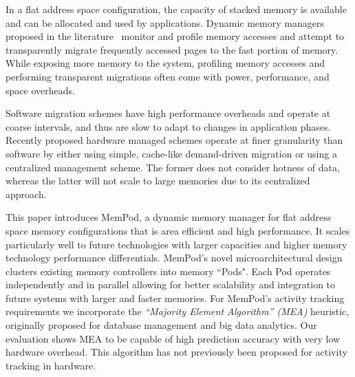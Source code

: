 In a flat address space configuration, the capacity of stacked memory is 
available and can be allocated and used by applications. Dynamic memory 
managers proposed in the literature~\cite{sim-micro2014,meswani-HPCA21,CAMEO} 
monitor and profile memory accesses and attempt to transparently migrate 
frequently accessed pages to the fast portion of memory. While exposing
more memory to the system, profiling memory accesses and performing 
transparent migrations often come with power, performance, and space overheads. 



Software migration schemes \cite{meswani-HPCA21} have high performance 
overheads and operate at coarse intervals, and thus are slow to adapt to 
changes in application phases. Recently proposed hardware managed schemes \cite{sim-micro2014,CAMEO} operate at finer granularity than software by either using simple, cache-like demand-driven migration or using a centralized management scheme. The former does not consider hotness of data, whereas the latter will not scale to large memories due to its centralized approach.

This paper introduces MemPod, a dynamic memory manager for flat address space memory configurations that is area efficient and high performance.
It scales particularly well to future technologies with larger capacities and
higher memory technology performance differentials. 
MemPod's novel microarchitectural design clusters existing memory controllers into memory ``Pods". Each Pod operates independently and in parallel allowing for better scalability and integration to future systems with larger and faster memories. For MemPod's activity tracking requirements we incorporate the \emph{``Majority Element Algorithm'' (MEA)} heuristic, originally proposed for database management and big data analytics. Our evaluation shows MEA to be capable of high prediction accuracy with very low hardware overhead. This algorithm has 
not previously been proposed for activity tracking in hardware.

